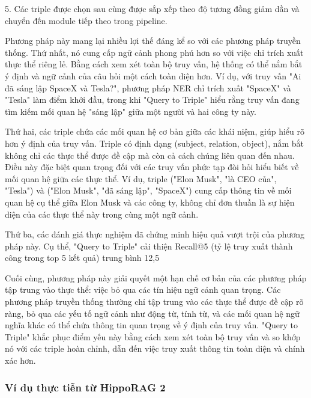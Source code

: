 \documentclass[../main.tex]{subfiles}
\begin{document}
5. Các triple được chọn sau cùng được sắp xếp theo độ tương đồng giảm dần và chuyển đến module tiếp theo trong pipeline.

Phương pháp này mang lại nhiều lợi thế đáng kể so với các phương pháp truyền thống. Thứ nhất, nó cung cấp ngữ cảnh phong phú hơn so với việc chỉ trích xuất thực thể riêng lẻ. Bằng cách xem xét toàn bộ truy vấn, hệ thống có thể nắm bắt ý định và ngữ cảnh của câu hỏi một cách toàn diện hơn. Ví dụ, với truy vấn "Ai đã sáng lập SpaceX và Tesla?", phương pháp NER chỉ trích xuất "SpaceX" và "Tesla" làm điểm khởi đầu, trong khi "Query to Triple" hiểu rằng truy vấn đang tìm kiếm mối quan hệ "sáng lập" giữa một người và hai công ty này.

Thứ hai, các triple chứa các mối quan hệ cơ bản giữa các khái niệm, giúp hiểu rõ hơn ý định của truy vấn. Triple có định dạng (subject, relation, object), nắm bắt không chỉ các thực thể được đề cập mà còn cả cách chúng liên quan đến nhau. Điều này đặc biệt quan trọng đối với các truy vấn phức tạp đòi hỏi hiểu biết về mối quan hệ giữa các thực thể. Ví dụ, triple ("Elon Musk", "là CEO của", "Tesla") và ("Elon Musk", "đã sáng lập", "SpaceX") cung cấp thông tin về mối quan hệ cụ thể giữa Elon Musk và các công ty, không chỉ đơn thuần là sự hiện diện của các thực thể này trong cùng một ngữ cảnh.

Thứ ba, các đánh giá thực nghiệm đã chứng minh hiệu quả vượt trội của phương pháp này. Cụ thể, "Query to Triple" cải thiện Recall@5 (tỷ lệ truy xuất thành công trong top 5 kết quả) trung bình 12,5%

Cuối cùng, phương pháp này giải quyết một hạn chế cơ bản của các phương pháp tập trung vào thực thể: việc bỏ qua các tín hiệu ngữ cảnh quan trọng. Các phương pháp truyền thống thường chỉ tập trung vào các thực thể được đề cập rõ ràng, bỏ qua các yếu tố ngữ cảnh như động từ, tính từ, và các mối quan hệ ngữ nghĩa khác có thể chứa thông tin quan trọng về ý định của truy vấn. "Query to Triple" khắc phục điểm yếu này bằng cách xem xét toàn bộ truy vấn và so khớp nó với các triple hoàn chỉnh, dẫn đến việc truy xuất thông tin toàn diện và chính xác hơn.

\subsubsection{Ví dụ thực tiễn từ HippoRAG 2}
\end{document}
